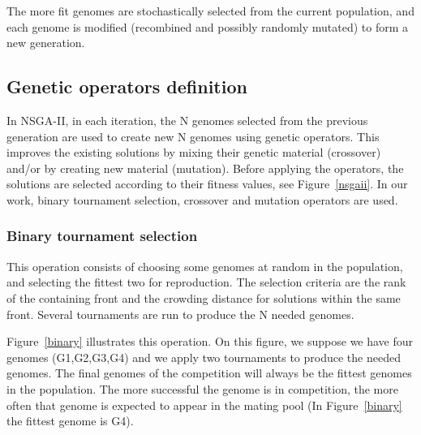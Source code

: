 \documentclass[conference]{IEEEtran}
\begin{document}
The more fit genomes are stochastically selected from the current population, and each genome is modified (recombined and possibly randomly mutated) to form a new generation.


\subsection{Genetic operators definition}
In NSGA-II, in each iteration, the N genomes selected from the previous generation are used to create new N genomes using genetic operators. This improves the existing solutions by mixing their genetic material (crossover) and/or by creating new material (mutation). Before applying the operators, the solutions are selected according to their fitness values, see Figure~\ref{nsgaii}. In our work, binary tournament selection, crossover and mutation operators are used.

\subsubsection{\textbf{Binary tournament selection}}
This operation consists of choosing some genomes at random in the population, and selecting the fittest two for reproduction. The selection criteria are the rank of the containing front and the crowding distance for solutions within the same front. Several tournaments are run to produce the N needed genomes.

Figure~\ref{binary} illustrates this operation. On this figure, we suppose we have four genomes (G1,G2,G3,G4) and we apply two tournaments to produce the needed genomes. The final genomes of the competition will always be the fittest genomes in the population. The more successful the genome is in competition, the more often that genome is expected to appear in the mating pool (In Figure~\ref{binary} the fittest genome is G4).
\end{document}

